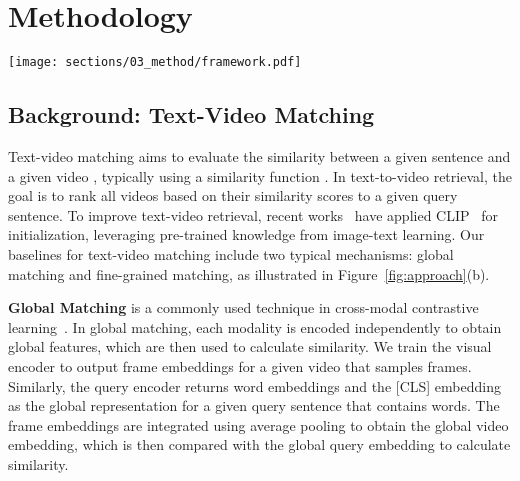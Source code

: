 \documentclass[10pt,twocolumn,letterpaper]{article}
\begin{document}
\section{Methodology}

\begin{figure*}[t]
\begin{center}
\texttt{[image: sections/03\_method/framework.pdf]}
\end{center}
\vspace{-0.5em}
\caption{An overview of our \textbf{Cap4Video} for text-video retrieval. We first generate captions using a zero-shot video captioner that combines CLIP~\cite{clip} with GPT-2~\cite{GPT}, leveraging knowledge from both frozen web-scale models. We then utilize the pre-extracted caption information from three different perspectives:
i) \emph{Input data:} We use the video and captions to create new positive pairs for data augmentation during training.
ii) \emph{Feature interaction:} We perform feature interaction between video and caption to capture intra- and inter-modality context, yielding enhanced video representations.
iii) \emph{Output score:} The Query-Caption matching branch can complement the original Query-Video matching branch for text-video retrieval.}
\label{fig:approach}
\end{figure*}



\subsection{Background: Text-Video Matching}
Text-video matching aims to evaluate the similarity between a given sentence  and a given video , typically using a similarity function . In text-to-video retrieval, the goal is to rank all videos based on their similarity scores to a given query sentence.
To improve text-video retrieval, recent works~\cite{luo2022clip4clip,gao2021clip2tv,fang2021clip2video} have applied CLIP~\cite{clip} for initialization, leveraging pre-trained knowledge from image-text learning.
Our baselines for text-video matching include two typical mechanisms: global matching and fine-grained matching, as illustrated in Figure~\ref{fig:approach}(b).


\textbf{Global Matching} is a commonly used technique in cross-modal contrastive learning~\cite{clip, jia2021ALIGN, luo2022clip4clip}. In global matching, each modality is encoded independently to obtain global features, which are then used to calculate similarity. We train the visual encoder to output  frame embeddings for a given video that samples  frames. Similarly, the query encoder returns  word embeddings and the [CLS] embedding as the global representation for a given query sentence that contains  words. The frame embeddings are integrated using average pooling to obtain the global video embedding, which is then compared with the global query embedding to calculate similarity.
\end{document}
